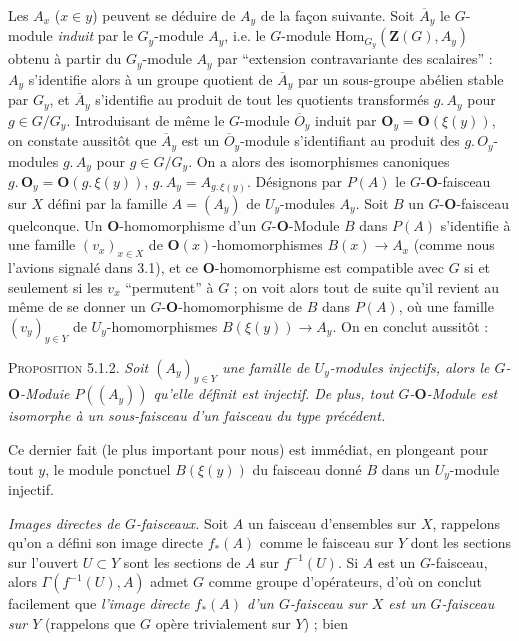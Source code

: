 Les $A_x$ ($x\in y$) peuvent se déduire de $A_y$ de la façon suivante. Soit
$\overline A_y$ le $G$-module \textit{induit} par le $G_y$-module $A_y$, i.e.
le $G$-module $\mathrm{Hom}_{G_y}(\mathbf Z(G),A_y)$ obtenu à partir du
$G_y$-module $A_y$ par ``extension contravariante des scalaires'' : $A_y$
s'identifie alors à un groupe quotient de $\overline A_y$ par un sous-groupe
abélien stable par $G_y$, et $\overline A_y$ s'identifie au produit de tout
les quotients transformés $g.\,A_y$ pour $g\in G/G_y$.
Introduisant de même le $G$-module $\overline O_y$ induit par
${\mathbf O}_y={\mathbf O}(\xi(y))$, on constate aussitôt que $\overline A_y$ est un
$\overline O_y$-module s'identifiant au produit des
$g.\,O_y$-modules $g.\,A_y$ pour $g\in G/G_y$. On a
alors des isomorphismes canoniques $g.\,{\mathbf O}_y={\mathbf O}(g.\,\xi(y))$, $g.\,A_y=A_{g.\,\xi(y)}$.
Désignons par $P(A)$ le $G$-${\mathbf O}$-faisceau sur $X$ défini par la famille
$A=(A_y)$ de $U_y$-modules $A_y$.
Soit $B$ un $G$-${\mathbf O}$-faisceau quelconque. Un ${\mathbf O}$-homomorphisme d'un
$G$-${\mathbf O}$-Module $B$ dans $P(A)$ s'identifie à une famille $(v_x)_{x\in X}$ de
${\mathbf O}(x)$-homomorphismes $B(x)\to A_x$ (comme nous l'avions signalé
dans 3.1), et ce ${\mathbf O}$-homomorphisme est compatible avec $G$ si et seulement si
les $v_x$ ``permutent'' à $G$ ; on voit alors tout de suite qu'il revient au
même de se donner un $G$-${\mathbf O}$-homomorphisme de $B$ dans $P(A)$, où une famille
$(v_y)_{y\in Y}$ de $U_y$-homomorphismes
$B(\xi(y))\to A_y$. On en conclut aussitôt :

\textsc{Proposition 5.1.2.} \textit{Soit $(A_y)_{y\in Y}$ une
famille de $U_y$-modules injectifs, alors le $G$-${\mathbf O}$-Moduie $P((A_y))$
qu'elle définit est injectif. De plus, tout $G$-${\mathbf O}$-Module est isomorphe à un
sous-faisceau d'un faisceau du type précédent.}

Ce dernier fait (le plus important pour nous) est immédiat, en plongeant pour
tout $y$, le module ponctuel $B(\xi(y))$ du faisceau donné $B$ dans un
$U_y$-module injectif.

\textit{Images directes de $G$-faisceaux.} Soit $A$ un faisceau
d'ensembles sur $X$, rappelons qu'on a défini son image directe $f_*(A)$ comme
le faisceau sur $Y$ dont les sections sur l'ouvert $U\subset Y$ sont les
sections de $A$ sur $f^{-1}(U)$. Si $A$ est un $G$-faisceau, alors
$\Gamma(f^{-1}(U),A)$ admet $G$ comme groupe d'opérateurs, d'où on conclut
facilement que \textit{l'image directe $f_*(A)$ d'un $G$-faisceau sur $X$ est
un $G$-faisceau sur $Y$} (rappelons que $G$ opère trivialement sur $Y$) ; bien

